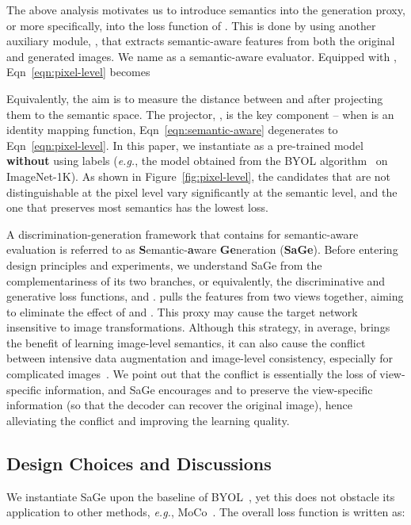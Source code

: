 \documentclass[10pt,twocolumn,letterpaper]{article}
\begin{document}
The above analysis motivates us to introduce semantics into the generation proxy, or more specifically, into the loss function of . This is done by using another auxiliary module, , that extracts semantic-aware features from both the original and generated images. We name  as a semantic-aware evaluator. Equipped with , Eqn~\eqref{eqn:pixel-level} becomes

Equivalently, the aim is to measure the distance between  and  after projecting them to the semantic space. The projector, , is the key component -- when  is an identity mapping function, Eqn~\eqref{eqn:semantic-aware} degenerates to Eqn~\eqref{eqn:pixel-level}. In this paper, we instantiate  as a pre-trained model \textbf{without} using labels (\textit{e.g.}, the model obtained from the BYOL algorithm~\cite{grill2020bootstrap} on ImageNet-1K). As shown in Figure~\ref{fig:pixel-level}, the candidates that are not distinguishable at the pixel level vary significantly at the semantic level, and the one that preserves most semantics has the lowest loss.

A discrimination-generation framework that contains  for semantic-aware evaluation is referred to as \textbf{S}emantic-\textbf{a}ware \textbf{Ge}neration (\textbf{SaGe}). Before entering design principles and experiments, we understand SaGe from the complementariness of its two branches, or equivalently, the discriminative and generative loss functions,  and .  pulls the features from two views together, aiming to eliminate the effect of  and . This proxy may cause the target network insensitive to image transformations. Although this strategy, in average, brings the benefit of learning image-level semantics, it can also cause the conflict between intensive data augmentation and image-level consistency, especially for complicated images~\cite{wang2021dense, pixpro}. We point out that the conflict is essentially the loss of view-specific information, and SaGe encourages  and  to preserve the view-specific information (so that the decoder can recover the original image), hence alleviating the conflict and improving the learning quality.

\subsection{Design Choices and Discussions}
\label{approach:design}

We instantiate SaGe upon the baseline of BYOL~\cite{grill2020bootstrap}, yet this does not obstacle its application to other methods, \textit{e.g.}, MoCo~\cite{he2020momentum}. The overall loss function is written as:
\end{document}

